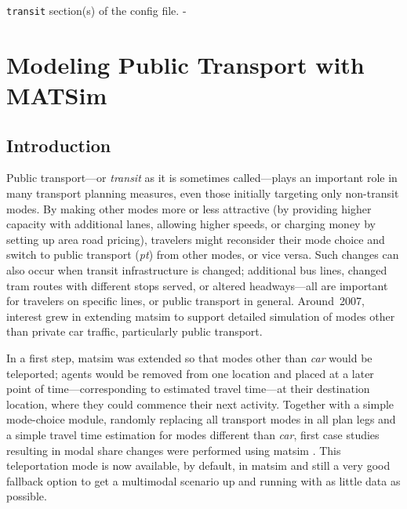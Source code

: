 \createStandardInformationBasic%
{}%
{}%
{\lstinline{transit} section(s) of the config file.}%
{-}


\section{Modeling Public Transport with MATSim}
\subsection{Introduction}
Public transport---or \emph{transit} as it is sometimes called---plays
an important role in many transport planning measures, even those initially
targeting only non-transit modes. By making other modes more or less
attractive (\eg by providing higher capacity with additional lanes, allowing
higher speeds, or charging money by setting up area road pricing), travelers
might reconsider their mode choice and switch to public transport (\emph{pt})
from other modes, or vice versa. Such changes can also occur when transit
infrastructure is changed; additional bus lines, changed tram routes with
different stops served, or altered headways---all are important for travelers
on specific lines, or public transport in general. Around~2007,
interest grew in extending \gls{matsim} to support detailed simulation of 
modes other than private car traffic, particularly public transport.

In a first step, \gls{matsim} was extended so that modes other than
\emph{car} would be \gls{teleported}; agents would be removed from one location
and placed at a later point of time---corresponding to estimated travel time---at
their destination location, where they could commence their next activity.
Together with a simple mode-choice module, randomly replacing all 
transport modes in all plan legs and a simple travel time estimation for
modes different than \emph{car}, first case studies resulting in modal share
changes were performed using \gls{matsim}
\citep{RieserGretherNagel2008modeChoiceCalculations,
GretherEtAl2009SimpleModeChoiceIPL}. This \gls{teleportation} mode is now available, by
default, in \gls{matsim} and still a very good fallback option to get a \gls{multimodal} scenario
up and running with as little data as possible.


